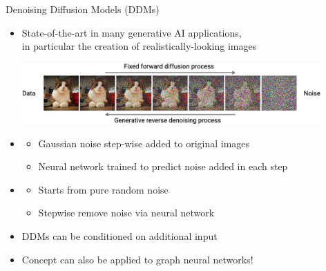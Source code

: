 \documentclass[aspectratio=1610]{beamer}
\newcommand{\important}[1]{{\color{green!60!black}#1}}
\begin{document}
\begin{frame}{Denoising Diffusion Models (DDMs)}
	\begin{itemize}
		\item State-of-the-art in many generative AI applications,\\
		in particular the creation of realistically-looking images
	
		\medskip
		\includegraphics[width=0.9\textwidth]{graphics/diffusion.png}
	
		\bigskip
		\item {}
		\begin{itemize}
			\item Gaussian noise step-wise added to original images
			\item Neural network trained to predict noise added in each step
		\end{itemize}
		\item {}
		\begin{itemize}
			\item Starts from pure random noise
			\item Stepwise remove noise via neural network
		\end{itemize}
		\item DDMs can be conditioned on additional input
		\item \important{Concept can also be applied to graph neural networks!}
	\end{itemize}
\end{frame}
\end{document}

